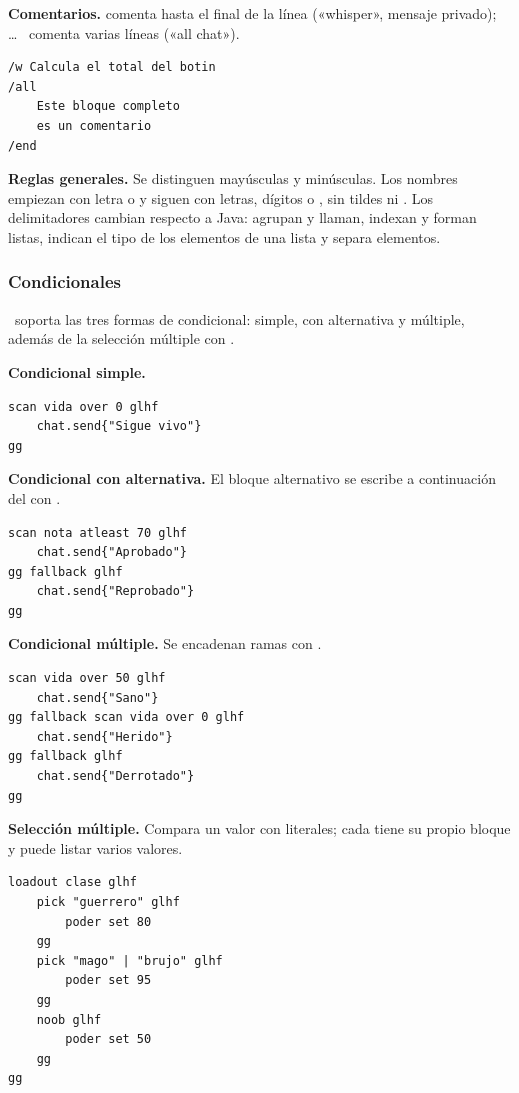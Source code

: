 \textbf{Comentarios.}  comenta hasta el final de la línea («whisper», mensaje privado);  \dots\  comenta varias líneas («all chat»).
\begin{lstlisting}
/w Calcula el total del botin
/all
    Este bloque completo
    es un comentario
/end
\end{lstlisting}

\textbf{Reglas generales.} Se distinguen mayúsculas y minúsculas. Los nombres empiezan con letra o \kw{\_} y siguen con letras, dígitos o \kw{\_}, sin tildes ni . Los delimitadores cambian respecto a Java: \kw{\{ \}} agrupan y llaman, \kw{< >} indexan y forman listas, \kw{[ ]} indican el tipo de los elementos de una lista y \kw{|} separa elementos.

\subsubsection{Condicionales}

\ggez\ soporta las tres formas de condicional: simple, con alternativa y múltiple, además de la selección múltiple con .

\textbf{Condicional simple.}
\begin{lstlisting}
scan vida over 0 glhf
    chat.send{"Sigue vivo"}
gg
\end{lstlisting}

\textbf{Condicional con alternativa.} El bloque alternativo se escribe a continuación del  con .
\begin{lstlisting}
scan nota atleast 70 glhf
    chat.send{"Aprobado"}
gg fallback glhf
    chat.send{"Reprobado"}
gg
\end{lstlisting}

\textbf{Condicional múltiple.} Se encadenan ramas con .
\begin{lstlisting}
scan vida over 50 glhf
    chat.send{"Sano"}
gg fallback scan vida over 0 glhf
    chat.send{"Herido"}
gg fallback glhf
    chat.send{"Derrotado"}
gg
\end{lstlisting}

\textbf{Selección múltiple.} Compara un valor con literales; cada  tiene su propio bloque y puede listar varios valores.
\begin{lstlisting}
loadout clase glhf
    pick "guerrero" glhf
        poder set 80
    gg
    pick "mago" | "brujo" glhf
        poder set 95
    gg
    noob glhf
        poder set 50
    gg
gg
\end{lstlisting}

